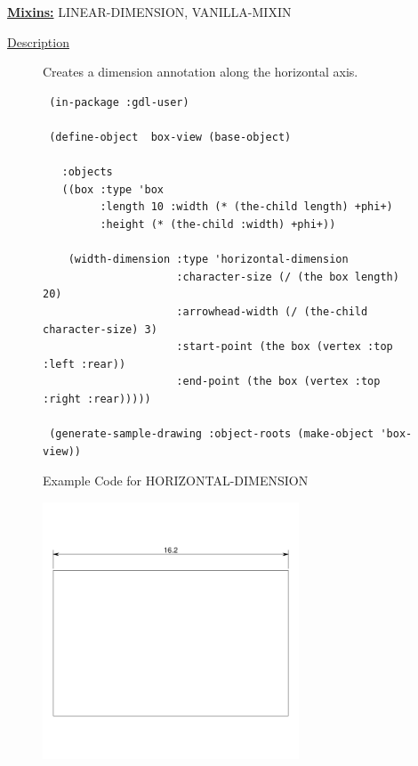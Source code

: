 \documentclass [11pt]{book}
\begin{document}
\begin{itemize}
\textbf{
\underline{Mixins:}} LINEAR-DIMENSION, VANILLA-MIXIN





\begin{description}

\item [
\underline{Description}]


Creates a dimension annotation along the horizontal axis.



\end{description}




\begin{figure}
\begin{lrbox}{\boxedverb}
\begin{minipage}{\linewidth}
{\small

\begin{verbatim}          
 (in-package :gdl-user)

 (define-object  box-view (base-object)
   
   :objects
   ((box :type 'box
         :length 10 :width (* (the-child length) +phi+)
         :height (* (the-child :width) +phi+))
   
    (width-dimension :type 'horizontal-dimension
                     :character-size (/ (the box length) 20)
                     :arrowhead-width (/ (the-child character-size) 3)
                     :start-point (the box (vertex :top :left :rear))
                     :end-point (the box (vertex :top :right :rear)))))

 (generate-sample-drawing :object-roots (make-object 'box-view)) 
\end{verbatim}}
\end{minipage}
\end{lrbox}
\fbox{\usebox{\boxedverb}}

\caption{Example Code for HORIZONTAL-DIMENSION}

\label{fig:example-code-HORIZONTAL-DIMENSION}

\end{figure}

\begin{figure}
\begin{center}
\includegraphics[width=3in,height=3in]{../images/example-horizontal-dimension.pdf}
\end{center}


\end{figure}
\end{itemize}
\end{document}
